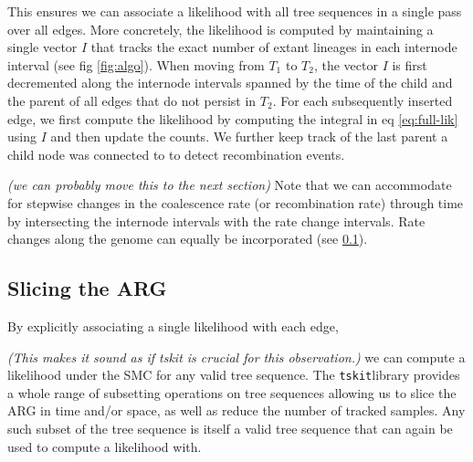 \documentclass{article}
\newcommand{\argweaver}[0]{\texttt{ARGweaver}}
\newcommand{\tskit}[0]{\texttt{tskit}}
\newcommand{\comment}[1]{{\it \color{orange} (#1)}}
\begin{document}
This ensures we can associate a likelihood
with all tree sequences in a single pass over all edges.
More concretely, the likelihood is computed by maintaining a single vector $I$ that tracks
the exact number of extant lineages in each internode interval (see fig \ref{fig:algo}).
When moving from $T_1$ to $T_2$, the vector $I$ is first decremented along the internode intervals
spanned by the time of the child and the parent of all edges that do not persist in $T_2$.
For each subsequently inserted edge, we first compute the likelihood by computing the integral
in eq \ref{eq:full-lik} using $I$ and then update the counts. We further keep track of
the last parent a child node was connected to to detect recombination events.


\comment{we can probably move this to the next section}
Note that we can accommodate for stepwise changes in the coalescence rate (or recombination rate)
through time by intersecting the internode intervals with the rate change intervals.
Rate changes along the genome can equally be incorporated (see \ref{sec:slicing}).



\subsection{Slicing the ARG} \label{sec:slicing}

By explicitly associating a single likelihood with each edge,

\comment{This makes it sound as if tskit is crucial for this observation.}
we can compute a likelihood
under the SMC for any valid tree sequence. The \tskit library provides a whole range
of subsetting operations on tree sequences allowing us to slice the ARG in time and/or space,
as well as reduce the number of tracked samples.
Any such subset of the tree sequence is itself a valid tree sequence
that can again be used to compute a likelihood with.
\end{document}
